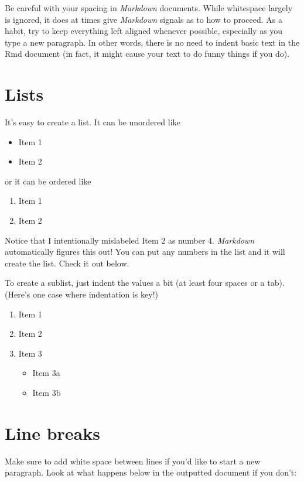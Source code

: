 \documentclass[12pt,twoside]{reedthesis}
\providecommand{\tightlist}{%
  \setlength{\itemsep}{0pt}\setlength{\parskip}{0pt}}
\begin{document}
Be careful with your spacing in \emph{Markdown} documents. While whitespace largely is ignored, it does at times give \emph{Markdown} signals as to how to proceed. As a habit, try to keep everything left aligned whenever possible, especially as you type a new paragraph. In other words, there is no need to indent basic text in the Rmd document (in fact, it might cause your text to do funny things if you do).

\hypertarget{lists}{%
\section{Lists}\label{lists}}

It's easy to create a list. It can be unordered like
\begin{itemize}
\tightlist
\item
  Item 1
\item
  Item 2
\end{itemize}
or it can be ordered like
\begin{enumerate}
\def\labelenumi{\arabic{enumi}.}
\tightlist
\item
  Item 1
\item
  Item 2
\end{enumerate}
Notice that I intentionally mislabeled Item 2 as number 4. \emph{Markdown} automatically figures this out! You can put any numbers in the list and it will create the list. Check it out below.

To create a sublist, just indent the values a bit (at least four spaces or a tab). (Here's one case where indentation is key!)
\begin{enumerate}
\def\labelenumi{\arabic{enumi}.}
\tightlist
\item
  Item 1
\item
  Item 2
\item
  Item 3
  \begin{itemize}
  \tightlist
  \item
    Item 3a
  \item
    Item 3b
  \end{itemize}
\end{enumerate}
\hypertarget{line-breaks}{%
\section{Line breaks}\label{line-breaks}}

Make sure to add white space between lines if you'd like to start a new paragraph. Look at what happens below in the outputted document if you don't:
\end{document}
